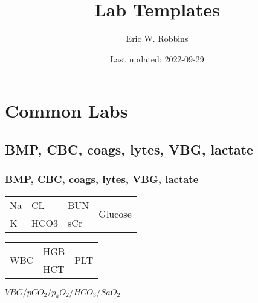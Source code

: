 \documentclass{beamer}
\title{Lab Templates}
\author{Eric W. Robbins}
\date{Last updated: 2022-09-29}
\begin{document}
	\begin{frame}
		\maketitle
	\end{frame}
\section{Common Labs}
	\subsection{BMP, CBC, coags, lytes, VBG, lactate}
		\begin{frame}
			\frametitle{BMP, CBC, coags, lytes, VBG, lactate}
			\begin{table}[]
				\begin{tabular}{l|l|l|l}
				Na	& CL & BUN & \multirow{2}{*}{Glucose} \\ \cline{1-3}
				K	& HCO3 & sCr  &                  
				\end{tabular}
			\end{table}
			
			\begin{table}[]
				\begin{tabular}{l|l|l}
					\multirow{2}{*}{WBC} & HGB & \multirow{2}{*}{PLT} \\ \cline{2-2}
					& HCT &                  
				\end{tabular}
			\end{table}
			
			$VBG/pCO_{2}/p_{a}O_{2}/HCO_{3}/SaO_{2}$
		\end{frame}
\end{document}
